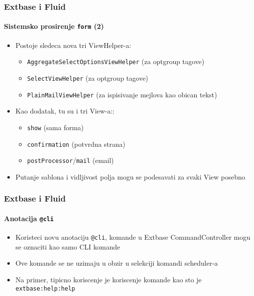 \begin{frame}[fragile]
	\frametitle{Extbase i Fluid}
	\framesubtitle{Sistemsko prosirenje \texttt{form} (2)}

	\begin{itemize}

		\item Postoje sledeca nova tri ViewHelper-a:

			\begin{itemize}
				\item \texttt{AggregateSelectOptionsViewHelper} (za optgroup tagove)
				\item \texttt{SelectViewHelper} (za optgroup tagove)
				\item \texttt{PlainMailViewHelper} (za ispisivanje mejlova kao obican tekst)
			\end{itemize}

		\item Kao dodatak, tu su i tri View-a::

			\begin{itemize}
				\item \texttt{show} (sama forma)
				\item \texttt{confirmation} (potvrdna strana)
				\item \texttt{postProcessor}/\texttt{mail} (email)
			\end{itemize}

		\item Putanje sablona i vidljivost polja mogu se podesavati za svaki View posebno

	\end{itemize}

\end{frame}


\begin{frame}[fragile]
	\frametitle{Extbase i Fluid}
	\framesubtitle{Anotacija \texttt{@cli}}

	\begin{itemize}

		\item Koristeci novu anotaciju \texttt{@cli}, komande u Extbase CommandController 
			mogu se oznaciti kao samo CLI komande

		\item Ove komande se ne uzimaju u obzir u selekciji komandi scheduler-a

		\item Na primer, tipicno koriscenje je koriscenje komande kao sto je \texttt{extbase:help:help} 

	\end{itemize}

\end{frame}

